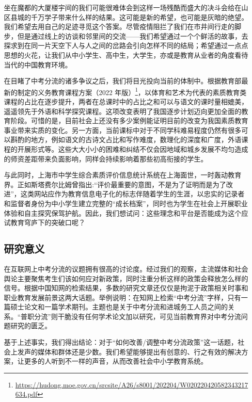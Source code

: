 \documentclass[12pt,UTF8]{ctexart}
\begin{document}
\par{坐在魔都的大厦楼宇间的我们可能很难体会到这样一场残酷而盛大的决斗会给在山区县城的千万学子带来什么样的结果。这可能是新的希望，也可能是灰暗的绝望。我们希望去用自己的足迹寻觅这个答案。尽管疫情阻拦了我们在市井间行走的脚步，但是通过线上的访谈和邻里间的交流——我们希望通过一个个鲜活的故事，去探求到在同一片天空下人与人之间的岔路会引向怎样不同的结局；希望通过一点点思想的火花，让我们从中小学生、高中生，大学生，亦或是教育从业者的角度看待当代的中国教育环境。}

\par{在目睹了中考分流的诸多争议之后，我们将目光投向当前的体制中。根据教育部最新的制定的义务教育课程方案（2022
	年版）\footnote{\url{https://hudong.moe.gov.cn/srcsite/A26/s8001/202204/W020220420582343217634.pdf}}，以体育和艺术为代表的素质教育类课程的占比在逐步提升，两者在总课时中的占比之和可以与语文的课时量相媲美，遥遥领先于外语和科学探究课程。这项改变表明了我国逐步计划迈向更加全面的教育阶段。可惜的是，目前社会上还没有多少案例能证明目前的改变为我国素质教育事业带来实质的变化。另一方面，当前课标中对于不同学科难易程度仍然有很多可以斟酌的地方，例如语文的古诗文占比和写作难度，数理化的深度和广度，外语课程的开展形式等。这些大大小小的困难和纠结不仅会因地域和城乡发展不均匀造成的师资差距带来负面影响，同样会持续影响着那些初高衔接的学生。}

\par{与此同时，上海市中学生综合素质评价信息统计系统在上海面世，一时轰动教育界。正如斯塔费尔比姆曾指出:“评价最重要的意图，不是为了证明而是为了改进”，这类网站应作为教育信息电子化的标志伴随着学生的生涯，以忠实的记录者和监督者身份为中小学生建立完整的“成长档案”，同时也为学生在社会上开展职业体验和自主探究保驾护航。因此，我们想试问：这些理念和平台是否能成为这个应试教育穹庐下的突破口呢？}

\subsection {研究意义}
\par{在互联网上中考分流的议题拥有很高的讨论度。经过我们的观察，主流媒体和社会舆论主要聚焦考生们该如何应对新政策，同时注重分析这样的政策会释放怎么样的信号。根据中国知网的检索结果，多数的研究文章还仅仅是拘泥于政策相关时事和职业教育发展前景这两大话题。举例说明：在知网上检索“中考分流”字样，只有一篇硕士论文和一篇学术期刊。主题也是关于中考分流和进城务工人员之间的关系。“普职分流”则干脆没有任何学术论文加以研究，可见当前教育界对中考分流问题研究的匮乏。}

\par{基于上述事实，我们得出结论：对于“如何改善/调整中考分流政策”这一话题，社会上发声的媒体和群体还是少数。我们希望能够提出有创意的、行之有效的解决方案，让更多的人听到不一样的声音，从而改善社会中小学教育系统。}
\end{document}

